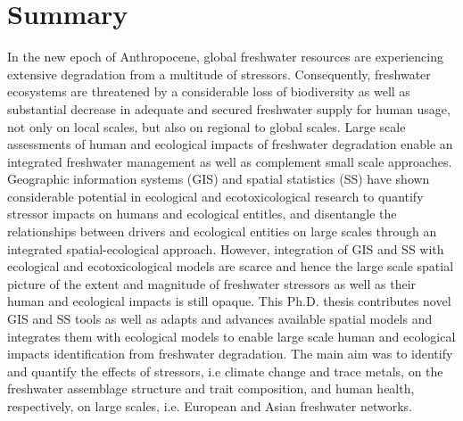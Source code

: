 \chapter{Summary}
\label{Summary}

In the new epoch of Anthropocene, global freshwater resources are experiencing extensive degradation from a multitude of stressors. Consequently, freshwater ecosystems are threatened by a considerable loss of biodiversity as well as substantial decrease in adequate and secured freshwater supply for human usage, not only on local scales, but also on regional to global scales. Large scale assessments of human and ecological impacts of freshwater degradation enable an integrated freshwater management as well as complement small scale approaches. Geographic information systems (GIS) and spatial statistics (SS) have shown considerable potential in ecological and ecotoxicological research to quantify stressor impacts on humans and ecological entitles, and disentangle the relationships between drivers and ecological entities on large scales through an integrated spatial-ecological approach. However, integration of GIS and SS with ecological and ecotoxicological models are scarce and hence the large scale spatial picture of the extent and magnitude of freshwater stressors as well as their human and ecological impacts is still opaque. This Ph.D. thesis contributes novel GIS and SS tools as well as adapts and advances available spatial models and integrates them with ecological models to enable large scale human and ecological impacts identification from freshwater degradation. The main aim was to identify and quantify the effects of stressors, i.e climate change and trace metals, on the freshwater assemblage structure and trait composition, and human health, respectively, on large scales, i.e. European and Asian freshwater networks.

